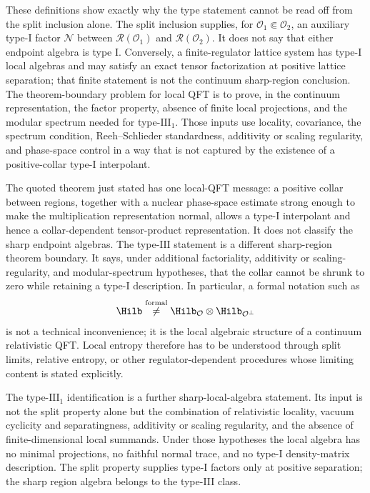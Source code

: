 These definitions show exactly why the type statement cannot be read off from
the split inclusion alone.  The split inclusion supplies, for
\(\mathcal O_1\Subset\mathcal O_2\), an auxiliary type-I factor
\(\mathcal N\) between
\(\mathcal R(\mathcal O_1)\) and \(\mathcal R(\mathcal O_2)\).  It does not
say that either endpoint algebra is type I.  Conversely, a finite-regulator
lattice system has type-I local algebras and may satisfy an exact tensor
factorization at positive lattice separation; that finite statement is not the
continuum sharp-region conclusion.  The theorem-boundary problem for local QFT
is to prove, in the continuum representation, the factor property, absence of
finite local projections, and the modular spectrum needed for
type-\(\mathrm{III}_1\).  Those inputs use locality, covariance, the spectrum
condition, Reeh--Schlieder standardness, additivity or scaling regularity, and
phase-space control in a way that is not captured by the existence of a
positive-collar type-I interpolant.

The quoted theorem just stated has one local-QFT message: a positive collar
between regions, together with a nuclear phase-space estimate strong enough to
make the multiplication representation normal, allows a type-I interpolant and
hence a collar-dependent tensor-product representation.  It does not classify
the sharp endpoint algebras.  The type-\(\mathrm{III}\) statement is a
different sharp-region theorem boundary.  It says, under additional
factoriality, additivity or scaling-regularity, and modular-spectrum
hypotheses, that the collar cannot be shrunk to zero while retaining a
type-I description.  In particular, a formal notation such as
\[
  \Hilb\stackrel{\rm formal}{\neq}
  \Hilb_{\mathcal O}\otimes\Hilb_{\mathcal O^\perp}
\]
is not a technical inconvenience; it is the local algebraic structure of a
continuum relativistic QFT.  Local entropy therefore has to be understood
through split limits, relative entropy, or other regulator-dependent
procedures whose limiting content is stated explicitly.

The type-\(\mathrm{III}_1\) identification is a further sharp-local-algebra
statement.  Its input is not the split property alone but the combination of
relativistic locality, vacuum cyclicity and separatingness, additivity or
scaling regularity, and the absence of finite-dimensional local summands.
Under those hypotheses the local algebra has no minimal projections, no
faithful normal trace, and no type-I density-matrix description.  The split
property supplies type-I factors only at positive separation; the sharp
region algebra belongs to the type-III class.

